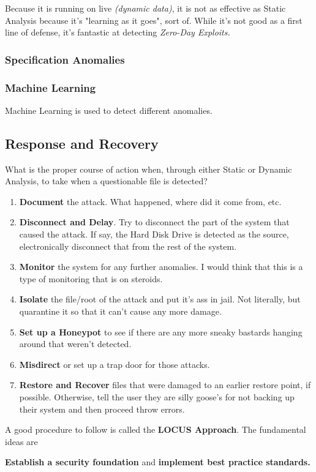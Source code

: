 Because it is running on live \textit{(dynamic data)}, it is not as effective as
Static Analysis because it's "learning as it goes", sort of. While it's not good
as a first line of defense, it's fantastic at detecting \textit{Zero-Day
Exploits.}

\subsubsection{Specification Anomalies}


\subsubsection{Machine Learning}
Machine Learning is used to detect different anomalies.
\subsection{Response and Recovery}
What is the proper course of action when, through either Static or Dynamic Analysis,
to take when a questionable file is detected?

\begin{enumerate}
    \item \textbf{Document} the attack. What happened, where did it come from, etc.
    \item \textbf{Disconnect and Delay}. Try to disconnect the part of the system that caused the attack. If say, the Hard Disk Drive is detected as the source, electronically disconnect that from the rest of the system.
    \item \textbf{Monitor} the system for any further anomalies. I would think that this is a type of monitoring that is on steroids.
    \item \textbf{Isolate} the file/root of the attack and put it's ass in jail. Not literally, but quarantine it so that it can't cause any more damage.
    \item \textbf{Set up a Honeypot} to see if there are any more sneaky bastards hanging around that weren't detected.
    \item \textbf{Misdirect} or set up a trap door for those attacks.
    \item \textbf{Restore and Recover} files that were damaged to an earlier restore point, if possible. Otherwise, tell the user they are silly goose's for not backing up their system and then proceed throw errors.
\end{enumerate}

\begin{tcolorbox}[mybox]
A good procedure to follow is called the \textbf{LOCUS Approach}. The fundamental ideas are
\begin{center}
    \textbf{Establish a security foundation} and \textbf{implement best practice standards.}
\end{center}

\end{tcolorbox}
